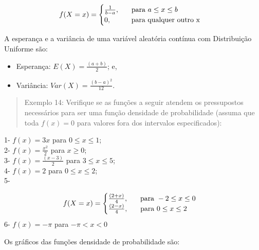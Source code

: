 \documentclass[
]{book}
\providecommand{\tightlist}{%
  \setlength{\itemsep}{0pt}\setlength{\parskip}{0pt}}
\begin{document}
\hfill\break

\[
f(X=x)=
\begin{cases}
    \frac{1}{b-a}, \hspace{0.6cm} \text{para } a \le x \le b \\
    0, \hspace{1cm} \text{para qualquer outro x}\\
\end{cases}
\]

\hfill\break

A esperança e a variância de uma variável aleatória contínua com Distribuição Uniforme são:

\begin{itemize}
\tightlist
\item
  Esperança: \(E(X) = \frac{(a+b)}{2}\); e,
\item
  Variância: \(Var(X) = \frac{(b-a)^{2} }{12}\).
\end{itemize}

\hfill\break

\begin{quote}
Exemplo 14: Verifique se as funções a seguir atendem os pressupostos necessários para ser uma função densidade de probabilidade (assuma que toda \(f(x)=0\) para valores fora dos intervalos especificados):
\end{quote}

\hfill\break

1- \(f(x)=3x\) para \(0 \le x \le 1\);\\
2- \(f(x)=\frac{x^{2}}{2}\) para \(x \ge 0\);\\
3- \(f(x) = \frac{(x-3)}{2}\) para \(3 \le x \le 5\);\\
4- \(f(x)=2\) para \(0 \le x \le 2\);\\
5-

\[
f(X=x)=
\begin{cases}
    \frac{(2+x)}{4}, \hspace{0.6cm} \text{para } -2 \le x \le 0 \\
    \frac{(2-x)}{4}, \hspace{0.6cm} \text{para } 0 \le x \le 2\\
\end{cases}
\]
6- \(f(x)=- \pi\) para \(-\pi < x < 0\)

\hfill\break

Os gráficos das funções densidade de probabilidade são:
\end{document}
